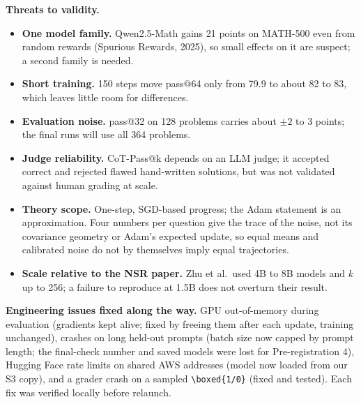\documentclass[11pt]{article}
\begin{document}
\textbf{Threats to validity.}
\begin{itemize}[leftmargin=*,itemsep=1pt]
\item \textbf{One model family.} Qwen2.5-Math gains 21 points on MATH-500 even from random rewards (Spurious Rewards, 2025), so small effects on it are suspect; a second family is needed.
\item \textbf{Short training.} 150 steps move pass@64 only from 79.9 to about 82 to 83, which leaves little room for differences.
\item \textbf{Evaluation noise.} pass@32 on 128 problems carries about $\pm2$ to 3 points; the final runs will use all 364 problems.
\item \textbf{Judge reliability.} CoT-Pass@k depends on an LLM judge; it accepted correct and rejected flawed hand-written solutions, but was not validated against human grading at scale.
\item \textbf{Theory scope.} One-step, SGD-based progress; the Adam statement is an approximation. Four numbers per question give the trace of the noise, not its covariance geometry or Adam's expected update, so equal means and calibrated noise do not by themselves imply equal trajectories.\item \textbf{Scale relative to the NSR paper.} Zhu et al.\ used 4B to 8B models and $k$ up to 256; a failure to reproduce at 1.5B does not overturn their result.
\end{itemize}

\textbf{Engineering issues fixed along the way.} GPU out-of-memory during evaluation (gradients kept alive; fixed by freeing them after each update, training unchanged), crashes on long held-out prompts (batch size now capped by prompt length; the final-check number and saved models were lost for Pre-registration 4), Hugging Face rate limits on shared AWS addresses (model now loaded from our S3 copy), and a grader crash on a sampled \verb|\boxed{1/0}| (fixed and tested). Each fix was verified locally before relaunch.
\end{document}
